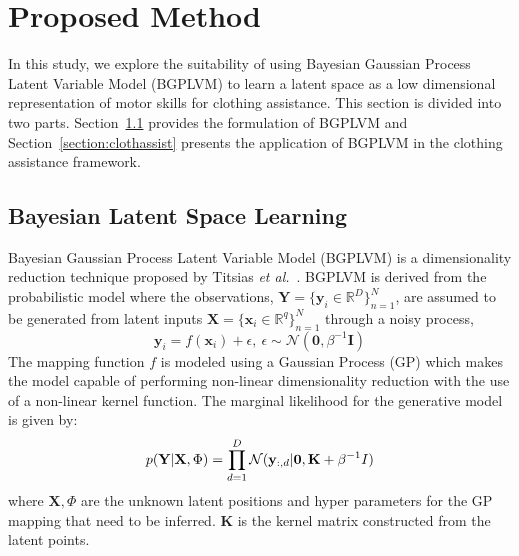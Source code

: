 \documentclass[a4paper]{article}
\begin{document}
\section{Proposed Method}
\label{section:method}

In this study, we explore the suitability of using Bayesian Gaussian Process Latent Variable Model (BGPLVM) to learn a latent space as a low dimensional representation of motor skills for clothing assistance. This section is divided into two parts. Section~\ref{section:bgplvm} provides the formulation of BGPLVM and Section~\ref{section:clothassist} presents the application of BGPLVM in the clothing assistance framework.

\subsection{Bayesian Latent Space Learning}
\label{section:bgplvm}

Bayesian Gaussian Process Latent Variable Model (BGPLVM) is a dimensionality reduction technique proposed by Titsias \emph{et al.}~\cite{bgplvm}. BGPLVM is derived from the probabilistic model where the observations, $\mathbf{Y} = \{\mathbf{y}_{i} \in \mathbb{R}^D\}_{n=1}^N$, are assumed to be generated from latent inputs $\mathbf{X} = \{\mathbf{x}_{i} \in \mathbb{R}^q\}_{n=1}^N$ through a noisy process,
\begin{equation}
  \mathbf{y}_i = f(\mathbf{x}_i) + \epsilon,~\epsilon \sim \mathcal{N}(\mathbf{0},\beta^{-1}\mathbf{I})
\end{equation}
The mapping function $f$ is modeled using a Gaussian Process (GP) which makes the model capable of performing non-linear dimensionality reduction with the use of a non-linear kernel function. The marginal likelihood for the generative model is given by:
\begin{equation}
  \label{eqn:marginallikelihood}
  p(\mathbf{Y}|\mathbf{X},\Phi) = \prod_{d=1}^{D} \mathcal{N}(\mathbf{y}_{:,d}|\mathbf{0},\mathbf{K}+\beta^{-1}I)\\
\end{equation}
where $\mathbf{X},\Phi$ are the unknown latent positions and hyper parameters for the GP mapping that need to be inferred. $\mathbf{K}$ is the kernel matrix constructed from the latent points.
\end{document}
